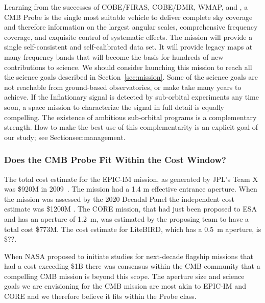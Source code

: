 Learning from the successes of COBE/FIRAS, COBE/DMR, WMAP, and \planck, a
CMB Probe is the single most suitable vehicle to deliver complete sky coverage 
and therefore information on the largest angular scales, 
comprehensive frequency coverage, and exquisite control of systematic effects. 
The mission will provide a single self-consistent and self-calibrated data set. It 
will provide legacy maps at many frequency bands that will become the basis for 
hundreds of new contributions to science. We should consider launching this mission to 
reach all the science goals described 
in Section~\ref{sec:mission}. Some of the science goals are not reachable
from ground-based observatories, or make take many years to achieve.   
If the Inflationary signal is detected by sub-orbital experiments
any time soon, a space mission to characterize the signal in full detail is equally compelling. 
The existence of ambitious sub-orbital programs is a complementary strength. How 
to make the best use of this complementarity is an explicit goal of our study; 
see Section{sec:management}.

\vspace{-0.18in}

\subsubsection{Does the CMB Probe Fit Within the Cost Window?} 

\vspace{-0.05in}

The total cost estimate for the EPIC-IM mission, as generated by JPL's Team X was \$920M in 2009~\cite{}. 
The mission had a 1.4 m effective entrance aperture. When the mission was assessed
by the 2020 Decadal Panel the independent cost estimate was \$1200M . The CORE mission, that had just been 
proposed to ESA and has an aperture of 1.2~m, was estimated by the proposing team to have a total cost \$773M. The cost
estimate for LiteBIRD, which has a 0.5~m aperture, is \$??. 

When NASA proposed to initiate studies for next-decade flagship missions that had a cost exceeding \$1B
there was consensus within the CMB community that a compelling CMB mission is beyond this scope.   
The aperture size and science goals we are envisioning for the CMB mission 
are most akin to EPIC-IM and CORE and we therefore believe it fits within the Probe class. 

\vspace{-0.18in}

